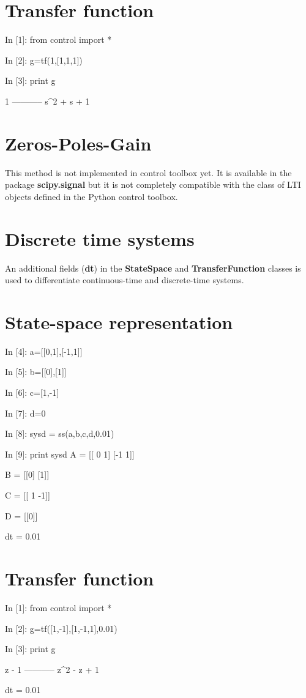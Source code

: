  
\section{Transfer function}

\begin{code}
 In [1]: from control import *

In [2]: g=tf(1,[1,1,1])

In [3]: print g

     1
-----------
s^2 + s + 1
\end{code}


\section{Zeros-Poles-Gain}
This method is not implemented in control toolbox yet. It is available in the 
package \textbf{scipy.signal} but it is not completely compatible with the 
class of LTI objects defined in the Python control toolbox.

\section{Discrete time systems}
An additional fields (\textbf{dt}) in the \textbf{StateSpace} and 
\textbf{TransferFunction} classes is used to differentiate continuous-time and 
discrete-time systems.

\section{State-space representation}
\begin{code}
In [4]: a=[[0,1],[-1,1]]

In [5]: b=[[0],[1]]

In [6]: c=[1,-1]

In [7]: d=0

In [8]: sysd = ss(a,b,c,d,0.01)

In [9]: print sysd
A = [[ 0  1]
 [-1  1]]

B = [[0]
 [1]]

C = [[ 1 -1]]

D = [[0]]

dt = 0.01
\end{code}


\section{Transfer function}
\begin{code}
In [1]: from control import *

In [2]: g=tf([1,-1],[1,-1,1],0.01)

In [3]: print g

   z - 1
-----------
z^2 - z + 1

dt = 0.01
\end{code}

